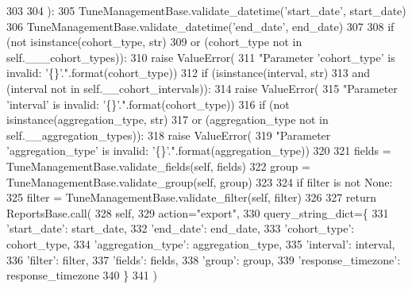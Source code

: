 \begin{DoxyCode}
303 
304     ):
305         TuneManagementBase.validate\_datetime(\textcolor{stringliteral}{'start\_date'}, start\_date)
306         TuneManagementBase.validate\_datetime(\textcolor{stringliteral}{'end\_date'}, end\_date)
307 
308         \textcolor{keywordflow}{if} (\textcolor{keywordflow}{not} isinstance(cohort\_type, str)
309             \textcolor{keywordflow}{or} (cohort\_type \textcolor{keywordflow}{not} \textcolor{keywordflow}{in} self.\_\_\_cohort\_types)):
310             \textcolor{keywordflow}{raise} ValueError(
311                 \textcolor{stringliteral}{"Parameter 'cohort\_type' is invalid: '\{\}'."}.format(cohort\_type))
312         \textcolor{keywordflow}{if} (isinstance(interval, str)
313             \textcolor{keywordflow}{and} (interval \textcolor{keywordflow}{not} \textcolor{keywordflow}{in} self.\_\_cohort\_intervals)):
314             \textcolor{keywordflow}{raise} ValueError(
315                 \textcolor{stringliteral}{"Parameter 'interval' is invalid: '\{\}'."}.format(cohort\_type))
316         \textcolor{keywordflow}{if} (\textcolor{keywordflow}{not} isinstance(aggregation\_type, str)
317             \textcolor{keywordflow}{or} (aggregation\_type \textcolor{keywordflow}{not} \textcolor{keywordflow}{in} self.\_\_aggregation\_types)):
318             \textcolor{keywordflow}{raise} ValueError(
319                 \textcolor{stringliteral}{"Parameter 'aggregation\_type' is invalid: '\{\}'."}.format(aggregation\_type))
320 
321         fields = TuneManagementBase.validate\_fields(self, fields)
322         group = TuneManagementBase.validate\_group(self, group)
323 
324         \textcolor{keywordflow}{if} filter \textcolor{keywordflow}{is} \textcolor{keywordflow}{not} \textcolor{keywordtype}{None}:
325             filter = TuneManagementBase.validate\_filter(self, filter)
326 
327         \textcolor{keywordflow}{return} ReportsBase.call(
328             self,
329             action=\textcolor{stringliteral}{"export"},
330             query\_string\_dict=\{
331                 \textcolor{stringliteral}{'start\_date'}: start\_date,
332                 \textcolor{stringliteral}{'end\_date'}: end\_date,
333                 \textcolor{stringliteral}{'cohort\_type'}: cohort\_type,
334                 \textcolor{stringliteral}{'aggregation\_type'}: aggregation\_type,
335                 \textcolor{stringliteral}{'interval'}: interval,
336                 \textcolor{stringliteral}{'filter'}: filter,
337                 \textcolor{stringliteral}{'fields'}: fields,
338                 \textcolor{stringliteral}{'group'}: group,
339                 \textcolor{stringliteral}{'response\_timezone'}: response\_timezone
340             \}
341         )

\end{DoxyCode}


